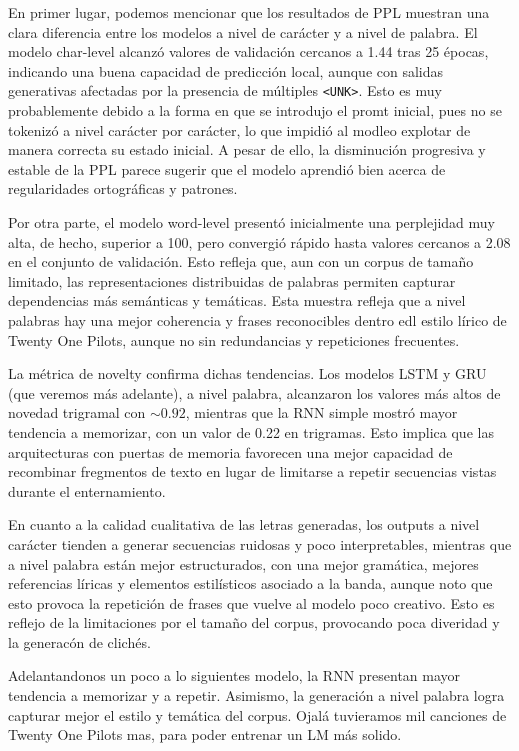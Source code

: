 En primer lugar, podemos mencionar que los resultados de PPL muestran una clara diferencia
entre los modelos a nivel de carácter y a nivel de palabra. El modelo char-level alcanzó valores
de validación cercanos a 1.44 tras 25 épocas, indicando una buena capacidad de predicción local, 
aunque con salidas generativas afectadas por la presencia de múltiples \texttt{<UNK>}. Esto 
es muy probablemente debido a la forma en que se introdujo el promt inicial, pues no se tokenizó
a nivel carácter por carácter, lo que impidió al modleo explotar de manera correcta su estado
inicial. A pesar de ello, la disminución progresiva y estable de la PPL parece sugerir que el 
modelo aprendió bien acerca de regularidades ortográficas y patrones. 

Por otra parte, el modelo word-level presentó inicialmente una perplejidad muy alta, de hecho, 
superior a 100, pero convergió rápido hasta valores cercanos a 2.08 en el conjunto de validación.
Esto refleja que, aun con un corpus de tamaño limitado, las representaciones distribuidas de palabras
permiten capturar dependencias más semánticas y temáticas. Esta muestra refleja que a nivel palabras
hay una mejor coherencia y frases reconocibles dentro edl estilo lírico de Twenty One Pilots, 
aunque no sin redundancias y repeticiones frecuentes. 

La métrica de novelty confirma dichas tendencias. Los modelos LSTM y GRU (que veremos más adelante),
a nivel palabra, alcanzaron los valores más altos de novedad trigramal con $\sim 0.92$, mientras
que la RNN simple mostró mayor tendencia a memorizar, con un valor de 0.22 en trigramas. Esto implica
que las arquitecturas con puertas de memoria favorecen una mejor capacidad de recombinar fregmentos
de texto en lugar de limitarse a repetir secuencias vistas durante el enternamiento. 

En cuanto a la calidad cualitativa de las letras generadas, los outputs a nivel carácter tienden 
a generar secuencias ruidosas y poco interpretables, mientras que a nivel palabra están mejor
estructurados, con una mejor gramática, mejores referencias líricas y elementos estilísticos
asociado a la banda, aunque noto que esto provoca la repetición de frases que vuelve al modelo
poco creativo. Esto es reflejo de la limitaciones por el tamaño del corpus, provocando poca 
diveridad y la generacón de clichés.

Adelantandonos un poco a lo siguientes modelo, la RNN presentan mayor tendencia a memorizar 
y a repetir. Asimismo, la generación a nivel palabra logra capturar mejor el estilo y temática
del corpus. Ojalá tuvieramos mil canciones de Twenty One Pilots mas, para poder entrenar un LM
más solido. 



\clearpage










